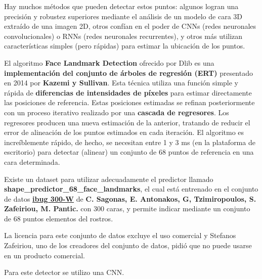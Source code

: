 \documentclass[10pt,journal,compsoc]{IEEEtran}\usepackage[T1]{fontenc}                              %
\begin{document}
Hay muchos métodos que pueden detectar estos puntos: algunos logran una
precisión y robustez superiores mediante el análisis de un modelo de
cara 3D extraído de una imagen 2D, otros confían en el poder de CNNs
(redes neuronales convolucionales) o RNNs (redes neuronales
recurrentes), y otros más utilizan características simples (pero
rápidas) para estimar la ubicación de los puntos.

El algoritmo \textbf{Face Landmark Detection} ofrecido por Dlib es una
\textbf{implementación del conjunto de árboles de regresión (ERT)}
presentado en 2014 por \textbf{Kazemi y Sullivan}. Esta técnica utiliza
una función simple y rápida de \textbf{diferencias de intensidades de
píxeles} para estimar directamente las posiciones de referencia. Estas
posiciones estimadas se refinan posteriormente con un proceso iterativo
realizado por una \textbf{cascada de regresores}. Los regresores
producen una nueva estimación de la anterior, tratando de reducir el
error de alineación de los puntos estimados en cada iteración. El
algoritmo es increíblemente rápido, de hecho, se necesitan entre 1 y 3
ms (en la plataforma de escritorio) para detectar (alinear) un conjunto
de 68 puntos de referencia en una cara determinada.

Existe un dataset para utilizar adecuadamente el predictor llamado
\textbf{shape\_predictor\_68\_face\_landmarks}, el cual está entrenado
en el conjunto de datos
\textbf{\href{https://ibug.doc.ic.ac.uk/resources/facial-point-annotations/}{ibug
300-W}} de \textbf{C. Sagonas, E. Antonakos, G, Tzimiropoulos, S.
Zafeiriou, M. Pantic.} con 300 caras, y permite indicar mediante un
conjunto de 68 puntos elementos del rostros.

La licencia para este conjunto de datos excluye el uso comercial y
Stefanos Zafeiriou, uno de los creadores del conjunto de datos, pidió
que no puede usarse en un producto comercial.

Para este detector se utilizo una CNN.
\end{document}
